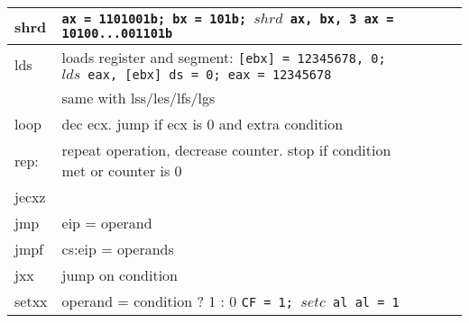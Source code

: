 \begin{tabular}{lllll}
shrd 	& {\tt ax = 1101001b; bx = 101b; $shrd$ ax, bx, 3 \ra ax  = 10100...001101b}\\
\midrule
lds 	&loads register and segment: {\tt [ebx] = 12345678, 0; $lds$ eax, [ebx] \ra ds = 0; eax = 12345678}\\%
& same with lss/les/lfs/lgs\\
loop 	& dec ecx. jump if ecx is 0 and extra condition\\
rep: 	& repeat operation, decrease counter. stop if condition met or counter is 0\\
jecxz 	& \\
jmp 	& eip = operand \\
jmpf 	& cs:eip = operands \\
jxx 	& jump on condition \\
setxx 	& operand = condition ? 1 : 0 {\tt CF = 1; $setc$ al \ra al = 1}\\
\bottomrule
\end{tabular}
\newpage
